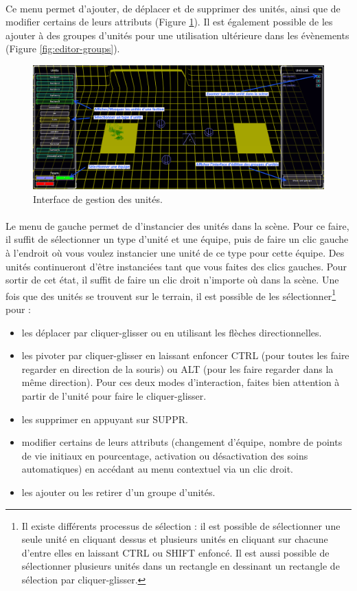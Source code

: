 \documentclass[a4paper]{article}
\begin{document}
\paragraph{ }
Ce menu permet d'ajouter, de déplacer et de supprimer des unités, ainsi que de modifier certains de leurs attributs (Figure \ref{fig:editor-units}). Il est également possible de les ajouter à des groupes d'unités pour une utilisation ultérieure dans les évènements (Figure \ref{fig:editor-groups}).
\begin{figure}[H]
\centering
\includegraphics[width=\linewidth]{editor-units.png}
\caption{Interface de gestion des unités.}
\label{fig:editor-units}
\end{figure}
\paragraph{ }
Le menu de gauche permet de d'instancier des unités dans la scène. Pour ce faire, il suffit de sélectionner un type d'unité et une équipe, puis de faire un clic gauche à l'endroit où vous voulez instancier une unité de ce type pour cette équipe. Des unités continueront d'être instanciées tant que vous faites des clics gauches. Pour sortir de cet état, il suffit de faire un clic droit n'importe où dans la scène. Une fois que des unités se trouvent sur le terrain, il est possible de les sélectionner\footnote{Il existe différents processus de sélection : il est possible de sélectionner une seule unité en cliquant dessus et plusieurs unités en cliquant sur chacune d'entre elles en laissant CTRL ou SHIFT enfoncé. Il est aussi possible de sélectionner plusieurs unités dans un rectangle en dessinant un rectangle de sélection par cliquer-glisser.} pour :
\begin{itemize}
\item les déplacer par cliquer-glisser ou en utilisant les flèches directionnelles.
\item les pivoter par cliquer-glisser en laissant enfoncer CTRL (pour toutes les faire regarder en direction de la souris) ou ALT (pour les faire regarder dans la même direction). Pour ces deux modes d'interaction, faites bien attention à partir de l'unité pour faire le cliquer-glisser. 
\item les supprimer en appuyant sur SUPPR.
\item modifier certains de leurs attributs (changement d'équipe, nombre de points de vie initiaux en pourcentage, activation ou désactivation des soins automatiques) en accédant au menu contextuel via un clic droit.
\item les ajouter ou les retirer d'un groupe d'unités.
\end{itemize}
\end{document}
